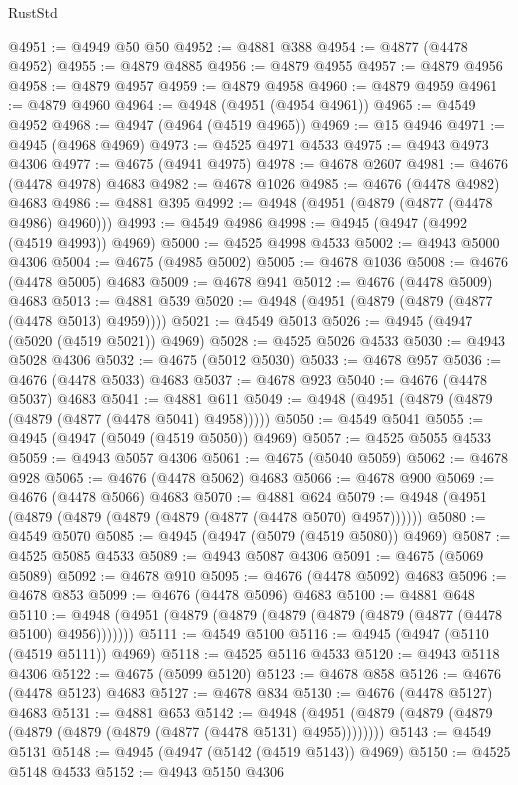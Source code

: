 \begin{lexlean}{RustStd}
\begin{coremodule}
@4951 := @4949 @50 @50
@4952 := @4881 @388
@4954 := @4877 (@4478 @4952)
@4955 := @4879 @4885
@4956 := @4879 @4955
@4957 := @4879 @4956
@4958 := @4879 @4957
@4959 := @4879 @4958
@4960 := @4879 @4959
@4961 := @4879 @4960
@4964 := @4948 (@4951 (@4954 @4961))
@4965 := @4549 @4952
@4968 := @4947 (@4964 (@4519 @4965))
@4969 := @15 @4946
@4971 := @4945 (@4968 @4969)
@4973 := @4525 @4971 @4533
@4975 := @4943 @4973 @4306
@4977 := @4675 (@4941 @4975)
@4978 := @4678 @2607
@4981 := @4676 (@4478 @4978) @4683
@4982 := @4678 @1026
@4985 := @4676 (@4478 @4982) @4683
@4986 := @4881 @395
@4992 := @4948 (@4951 (@4879 (@4877 (@4478 @4986) @4960)))
@4993 := @4549 @4986
@4998 := @4945 (@4947 (@4992 (@4519 @4993)) @4969)
@5000 := @4525 @4998 @4533
@5002 := @4943 @5000 @4306
@5004 := @4675 (@4985 @5002)
@5005 := @4678 @1036
@5008 := @4676 (@4478 @5005) @4683
@5009 := @4678 @941
@5012 := @4676 (@4478 @5009) @4683
@5013 := @4881 @539
@5020 := @4948 (@4951 (@4879 (@4879 (@4877 (@4478 @5013) @4959))))
@5021 := @4549 @5013
@5026 := @4945 (@4947 (@5020 (@4519 @5021)) @4969)
@5028 := @4525 @5026 @4533
@5030 := @4943 @5028 @4306
@5032 := @4675 (@5012 @5030)
@5033 := @4678 @957
@5036 := @4676 (@4478 @5033) @4683
@5037 := @4678 @923
@5040 := @4676 (@4478 @5037) @4683
@5041 := @4881 @611
@5049 := @4948 (@4951 (@4879 (@4879 (@4879 (@4877 (@4478 @5041) @4958)))))
@5050 := @4549 @5041
@5055 := @4945 (@4947 (@5049 (@4519 @5050)) @4969)
@5057 := @4525 @5055 @4533
@5059 := @4943 @5057 @4306
@5061 := @4675 (@5040 @5059)
@5062 := @4678 @928
@5065 := @4676 (@4478 @5062) @4683
@5066 := @4678 @900
@5069 := @4676 (@4478 @5066) @4683
@5070 := @4881 @624
@5079 := @4948 (@4951 (@4879 (@4879 (@4879 (@4879 (@4877 (@4478 @5070) @4957))))))
@5080 := @4549 @5070
@5085 := @4945 (@4947 (@5079 (@4519 @5080)) @4969)
@5087 := @4525 @5085 @4533
@5089 := @4943 @5087 @4306
@5091 := @4675 (@5069 @5089)
@5092 := @4678 @910
@5095 := @4676 (@4478 @5092) @4683
@5096 := @4678 @853
@5099 := @4676 (@4478 @5096) @4683
@5100 := @4881 @648
@5110 := @4948 (@4951 (@4879 (@4879 (@4879 (@4879 (@4879 (@4877 (@4478 @5100) @4956)))))))
@5111 := @4549 @5100
@5116 := @4945 (@4947 (@5110 (@4519 @5111)) @4969)
@5118 := @4525 @5116 @4533
@5120 := @4943 @5118 @4306
@5122 := @4675 (@5099 @5120)
@5123 := @4678 @858
@5126 := @4676 (@4478 @5123) @4683
@5127 := @4678 @834
@5130 := @4676 (@4478 @5127) @4683
@5131 := @4881 @653
@5142 := @4948 (@4951 (@4879 (@4879 (@4879 (@4879 (@4879 (@4879 (@4877 (@4478 @5131) @4955))))))))
@5143 := @4549 @5131
@5148 := @4945 (@4947 (@5142 (@4519 @5143)) @4969)
@5150 := @4525 @5148 @4533
@5152 := @4943 @5150 @4306

\end{coremodule}
\end{lexlean}
